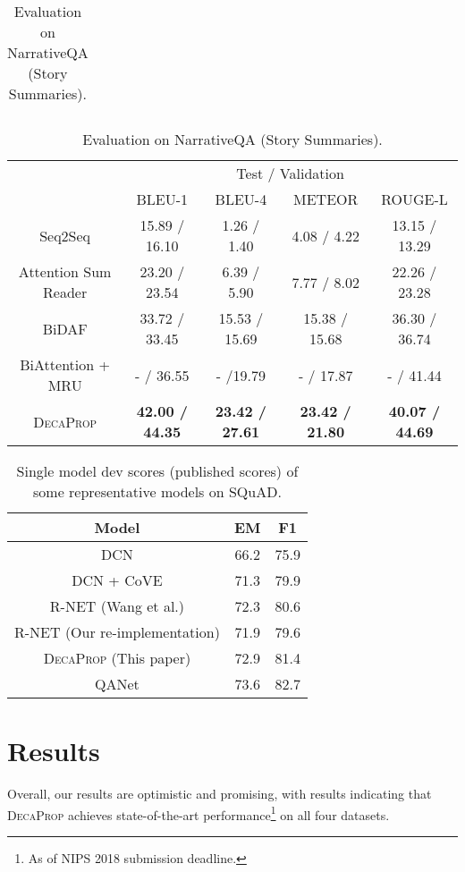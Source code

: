 \documentclass{article}
\begin{document}
\begin{table}[t]
\begin{minipage}[t]{.46\linewidth}
\begin{tabular}{lrrrr}
    \end{tabular}

     \caption{Evaluation on Exact Match and F1 Metrics on SearchQA dataset.}
  \label{tab:searchqa2}\end{minipage}
\centering

    \begin{tabular}{ccccc}
      \hline
      & \multicolumn{4}{c}{Test / Validation}\\
          & BLEU-1 & BLEU-4 & METEOR & ROUGE-L \\
          \hline
    Seq2Seq & 15.89 / 16.10 & 1.26 / 1.40 & 4.08 / 4.22 & 13.15 / 13.29 \\
    Attention Sum Reader & 23.20 / 23.54 & 6.39 / 5.90 & 7.77 / 8.02 & 22.26 / 23.28 \\
    BiDAF  & 33.72 / 33.45 & 15.53 / 15.69 & 15.38 / 15.68 & 36.30 / 36.74 \\
    BiAttention + MRU &  - / 36.55 & - /19.79 &  - / 17.87 & - / 41.44  \\
    \hline
    \textsc{DecaProp} & \textbf{42.00 / 44.35} & \textbf{23.42 / 27.61} & \textbf{23.42 / 21.80} & \textbf{40.07 / 44.69} \\
\hline
    \end{tabular}

  \caption{Evaluation on NarrativeQA (Story Summaries).}
  \label{tab:NarrativeQA}\end{table}

\begin{table*}
  \small
  \centering
\begin{tabular}{ccc}
\hline
Model & EM & F1 \\
\hline
DCN \citep{DBLP:journals/corr/XiongZS16} & 66.2 & 75.9 \\
DCN + CoVE \citep{mccann2017learned} & 71.3 & 79.9 \\
R-NET (Wang et al.) \citep{wang2017gated} & 72.3 & 80.6 \\
R-NET (Our re-implementation) & 71.9 & 79.6 \\
\textsc{DecaProp} (This paper) & 72.9 & 81.4 \\
QANet \citep{yu2018qanet} & 73.6 & 82.7 \\
\hline
\end{tabular}
\caption{Single model dev scores (published scores) of some representative models on SQuAD. }
\label{tab:squad}
\end{table*}

\section{Results}
Overall, our results are optimistic and promising, with results indicating that \textsc{DecaProp} achieves state-of-the-art performance\footnote{As of NIPS 2018 submission deadline.} on all four datasets.
\end{document}
